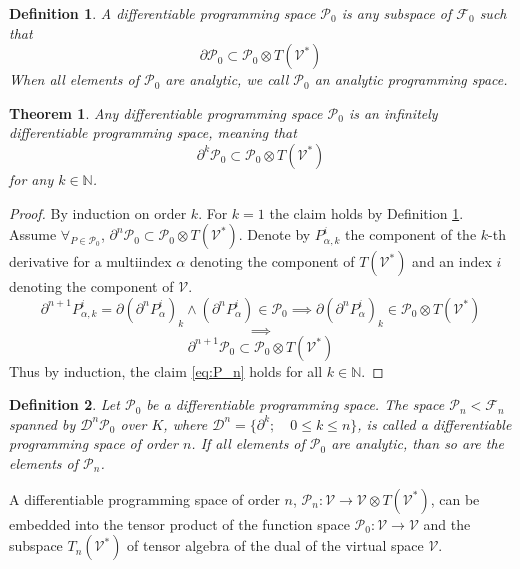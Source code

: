 \documentclass[smallcondensed]{svjour3}
\newcommand{\VV}{\mathcal{V}}
\newcommand{\F}{\mathcal{F}}
\newcommand{\dP}{\mathcal{P}}
\newcommand{\D}{\partial}
\newcommand{\DD}{\mathcal{D}}
\newtheorem{definicija}{Definition}[section]
\newtheorem{izrek}{Theorem}[section]
\begin{document}
 
 \begin{definicija}\label{def:dP}
 	A \emph{differentiable programming space} $\dP_0$ is any subspace of $\F_0$ such that
 	\begin{equation}\label{eq:P}
 	\D\dP_0\subset\dP_0\otimes T(\VV^*)
 	\end{equation}
 	When all elements of $\dP_0$ are analytic, we call $\dP_0$ an \emph{analytic programming space}.
 \end{definicija}
 
\begin{izrek}\label{izr:P}
	Any differentiable programming space $\dP_0$ is an
  infinitely differentiable programming space, meaning that
	\begin{equation}\label{eq:P_n}
	 		\D^k\dP_0\subset\dP_0\otimes T(\VV^*)
	 	\end{equation}
for any $k\in\mathbb{N}$.
\end{izrek}
\begin{proof} By induction on order $k$. For $k=1$ the claim holds by Definition
  \ref{def:dP}. Assume	$\forall_{P\in\dP_0}$,
  $\D^n\dP_0\subset\dP_0\otimes T(\VV^*)$. Denote by $P_{\alpha,k}^i$ the
  component of the $k$-th derivative for a multiindex $\alpha$  denoting the
  component of $T(\VV^*)$ and an index $i$ denoting the component of $\VV$.
	\begin{equation}\label{eq:inductionStep}
\D^{n+1}P_{\alpha,k}^i=\D(\D^n P^i_\alpha)_k\land(\D^n P^i_\alpha)\in\dP_0\implies \D(\D^n P^i_\alpha)_k\in \dP_0\otimes T(\VV^*)
	\end{equation}
	$$\implies$$
	$$\D^{n+1}\dP_0\subset\dP_0\otimes T(\VV^*)$$
Thus by induction, the claim \eqref{eq:P_n} holds for all $k\in \mathbb{N}$. 
\end{proof}

\begin{definicija}\label{def:P_n}
Let $\dP_0$ be a differentiable programming space. The space $\dP_n<\F_n$ spanned by $\DD^n\dP_0$ over $K$, where $\DD^n=\{\partial^k;\quad 0\le k\le n\}$, is called a differentiable programming space of order $n$. 
If all elements of $\dP_0$ are analytic, than so are the elements of $\dP_n$.
\end{definicija}


 \begin{corollary}\label{izr:P_n}
 	A differentiable programming space of order $n$, $\dP_n:\VV\to \VV\otimes T(\VV^*)$, can be embedded into the tensor
  product of the function space $\dP_0:\VV\to \VV$ and the subspace $T_n(\VV^*)$ of
  tensor algebra of the dual of the virtual space $\VV$.
 \end{corollary}
 
\end{document}
